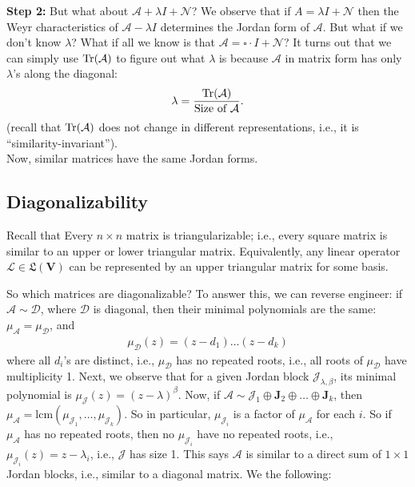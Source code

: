 \documentclass{article}
\theoremstyle{definition}
\newcommand{\V}{\mathbf{V}}
\newcommand{\A}{\mathcal{A}}
\newcommand{\lag}{\mathcal{L}}
\newcommand{\J}{\mathbf{J}}
\newcommand{\jor}{\mathcal{J}}
\newcommand{\LL}{\mathfrak{L}}
\begin{document}
\textbf{Step 2:} But what about $\A + \lambda I + \mathcal{N}$? We observe that if $A = \lambda I + \mathcal{N}$ then the Weyr characteristics of $\A - \lambda I$ determines the Jordan form of $\A$. But what if we don't know $\lambda$? What if all we know is that $\A = \square \cdot I + \mathcal{N}$? It turns out that we can simply use $\Tr(\A)$ to figure out what $\lambda$ is because $\A$ in matrix form has only $\lambda$'s along the diagonal:
\begin{align*}
\lambda = \frac{\Tr(\A)}{\text{Size of }\A}. 
\end{align*}
(recall that $\Tr(\A)$ does not change in different representations, i.e., it is ``similarity-invariant'').\\

Now, similar matrices have the same Jordan forms. 

  
  
  
\subsection{Diagonalizability}

Recall that Every $n\times n$ matrix is triangularizable; i.e., every square matrix is similar to an upper or lower triangular matrix. Equivalently, any linear operator $\lag \in \LL(\V)$ can be represented by an upper triangular matrix for some basis. 

So which matrices are diagonalizable? To answer this, we can reverse engineer: if $\A \sim \mathcal{D}$, where $\mathcal{D}$ is diagonal, then their minimal polynomials are the same: $\mu_\A = \mu_\mathcal{D}$, and
\begin{align*}
\mu_\mathcal{D}(z) = (z-d_1)\dots (z- d_k)
\end{align*}
where all $d_i$'s are distinct, i.e., $\mu_\mathcal{D}$ has no repeated roots, i.e., all roots of $\mu_\mathcal{D}$ have multiplicity 1. Next, we observe that for a given Jordan block $\jor_{\lambda,\beta}$, its minimal polynomial is $\mu_\jor(z) = (z-\lambda)^\beta$. Now, if $\A \sim \jor_1\oplus\J_2\oplus \dots \oplus \J_k$, then $\mu_\A = \text{lcm}(\mu_{\jor_1}, \dots,\mu_{\jor_k})$. So in particular, $\mu_{\jor_i}$ is a factor of $\mu_\A$ for each $i$. So if $\mu_\A$ has no repeated roots, then no $\mu_{\jor_i}$ have no repeated roots, i.e., $\mu_{\jor_i}(z) = z - \lambda_i$, i.e., $\jor$ has size 1. This says $\A$ is similar to a direct sum of $1\times 1$ Jordan blocks, i.e., similar to a diagonal matrix. We the following:
\end{document}
